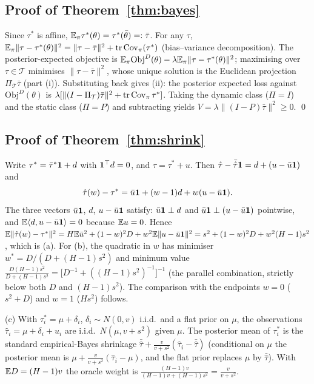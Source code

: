 \subsection{Proof of Theorem~\ref{thm:bayes}}
Since $\tau^*$ is affine, $\mathbb{E}_\pi\tau^*(\theta)=\tau^*(\bar\theta)=:\bar\tau$. For any $\tau$, $\mathbb{E}_\pi\|\tau-\tau^*(\theta)\|^2=\|\tau-\bar\tau\|^2+\operatorname{tr}\operatorname{Cov}_\pi(\tau^*)$ (bias--variance decomposition). The posterior-expected objective is $\mathbb{E}_\pi\mathrm{Obj}^D(\theta)-\lambda\mathbb{E}_\pi\|\tau-\tau^*(\theta)\|^2$; maximising over $\tau\in\mathcal T$ minimises $\|\tau-\bar\tau\|^2$, whose unique solution is the Euclidean projection $\Pi_{\mathcal T}\bar\tau$ (part (i)). Substituting back gives (ii): the posterior expected loss against $\mathrm{Obj}^D(\theta)$ is $\lambda[\|(I-\Pi_{\mathcal T})\bar\tau\|^2+\operatorname{tr}\operatorname{Cov}_\pi\tau^*]$. Taking the dynamic class ($\Pi=I$) and the static class ($\Pi=P$) and subtracting yields $V=\lambda\|(I-P)\bar\tau\|^2\ge0$. \qed

\subsection{Proof of Theorem~\ref{thm:shrink}}
Write $\tau^*=\bar\tau^*\mathbf{1}+d$ with $\mathbf{1}^\top d=0$, and $\hat\tau=\tau^*+u$. Then $\hat\tau-\bar{\hat\tau}\mathbf{1}=d+(u-\bar u\mathbf{1})$ and
\[\hat\tau(w)-\tau^*=\bar u\mathbf{1}+(w-1)d+w(u-\bar u\mathbf{1}).\]
The three vectors $\bar u\mathbf{1}$, $d$, $u-\bar u\mathbf{1}$ satisfy: $\bar u\mathbf{1}\perp d$ and $\bar u\mathbf{1}\perp(u-\bar u\mathbf{1})$ pointwise, and $\mathbb{E}\langle d,u-\bar u\mathbf{1}\rangle=0$ because $\mathbb{E} u=0$. Hence $\mathbb{E}\|\hat\tau(w)-\tau^*\|^2=H\mathbb{E}\bar u^2+(1-w)^2D+w^2\mathbb{E}\|u-\bar u\mathbf{1}\|^2=s^2+(1-w)^2D+w^2(H-1)s^2$, which is (a). For (b), the quadratic in $w$ has minimiser $w^*=D/(D+(H-1)s^2)$ and minimum value $\frac{D(H-1)s^2}{D+(H-1)s^2}=\big[D^{-1}+((H-1)s^2)^{-1}\big]^{-1}$ (the parallel combination, strictly below both $D$ and $(H-1)s^2$). The comparison with the endpoints $w=0$ ($s^2+D$) and $w=1$ ($Hs^2$) follows.

(c) With $\tau_i^*=\mu+\delta_i$, $\delta_i\sim N(0,v)$ i.i.d.\ and a flat prior on $\mu$, the observations $\hat\tau_i=\mu+\delta_i+u_i$ are i.i.d.\ $N(\mu,v+s^2)$ given $\mu$. The posterior mean of $\tau_i^*$ is the standard empirical-Bayes shrinkage $\bar{\hat\tau}+\frac{v}{v+s^2}(\hat\tau_i-\bar{\hat\tau})$ (conditional on $\mu$ the posterior mean is $\mu+\frac v{v+s^2}(\hat\tau_i-\mu)$, and the flat prior replaces $\mu$ by $\bar{\hat\tau}$). With $\mathbb{E} D=(H-1)v$ the oracle weight is $\frac{(H-1)v}{(H-1)v+(H-1)s^2}=\frac v{v+s^2}$.

